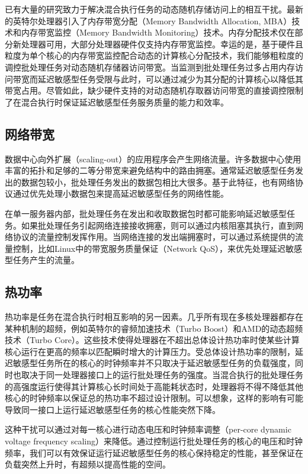 已有大量的研究致力于解决混合执行任务的动态随机存储访问上的相互干扰\cite{iyer2007qos}\cite{jeong2012qos}\cite{muralidhara2011reducing}\cite{nesbit2006fair}。最新的英特尔处理器引入了内存带宽分配（Memory Bandwidth Allocation, MBA）技术和内存带宽监控（Memory Bandwidth Monitoring）技术\cite{iyer2007qos}\cite{guide2011intel}。内存分配技术仅在部分新处理器可用，大部分处理器硬件仅支持内存带宽监控\cite{guide2011intel}。幸运的是，基于硬件且粒度为单个核心的内存带宽监控配合动态的计算核心分配技术，我们能够粗粒度的调控批处理任务对动态随机存储器访问带宽\cite{lo2015heracles}。当监测到批处理任务过多占用内存访问带宽而延迟敏感型任务受限与此时，可以通过减少为其分配的计算核心以降低其带宽占用。尽管如此，缺少硬件支持的对动态随机存取器访问带宽的直接调控限制了在混合执行时保证延迟敏感型任务服务质量的能力和效率。

\subsection{网络带宽}
数据中心向外扩展（scaling-out）的应用程序会产生网络流量。许多数据中心使用丰富的拓扑和足够的二等分带宽来避免结构中的路由拥塞\cite{al2008scalable}\cite{issariyakul2011introduction}。通常延迟敏感型任务发出的数据包较小，批处理任务发出的数据包相比大很多。基于此特征，也有网络协议通过优先处理小数据包来提高延迟敏感型任务的网络性能\cite{wilson2011better}\cite{alizadeh2010data}。

在单一服务器内部，批处理任务在发出和收取数据包时都可能影响延迟敏感型任务。如果批处理任务引起网络连接接收拥塞，则可以通过内核阻塞其执行，直到网络协议的流量控制发挥作用\cite{podlesny2012solving}。当网络连接的发出端拥塞时，可以通过系统提供的流量控制，比如Linux中的带宽服务质量保证（Network QoS），来优先处理延迟敏感型任务产生的流量\cite{brown2006traffic}。


\subsection{热功率}
热功率是任务在混合执行时相互影响的另一因素。几乎所有现在多核处理器都存在某种机制的超频，例如英特尔的睿频加速技术（Turbo Boost）和AMD的动态超频技术（Turbo Core）。这些技术使得处理器在不超出总体设计热功率时使某些计算核心运行在更高的频率以匹配瞬时增大的计算压力。受总体设计热功率的限制，延迟敏感型任务所在的核心的时钟频率并不只取决于延迟敏感型任务的负载强度，同时也取决于同一处理器接口上的运行批处理任务的强度。当混合执行的批处理任务的高强度运行使得其计算核心长时间处于高能耗状态时，处理器将不得不降低其他核心的时钟频率以保证总的热功率不超过设计限制。可以想象，这样的影响有可能导致同一接口上运行延迟敏感型任务的核心性能突然下降。

这种干扰可以通过对每一核心进行动态电压和时钟频率调整（per-core dynamic voltage frequency scaling）来降低。通过控制运行批处理任务的核心的电压和时钟频率，我们可以有效保证运行延迟敏感型任务的核心保持稳定的性能，甚至保证在负载突然上升时，有超频以提高性能的空间。




